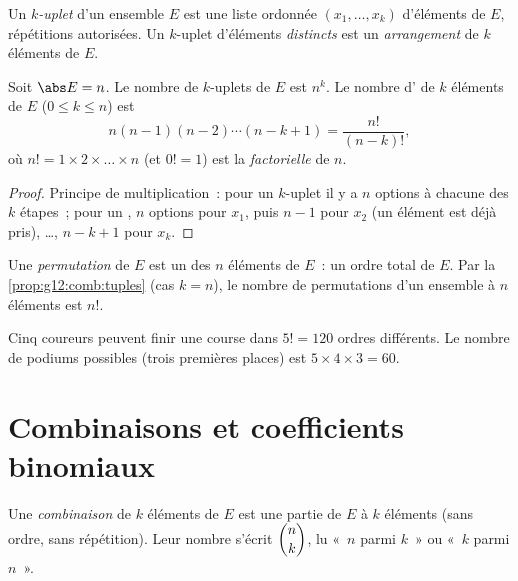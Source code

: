 \begin{definition}[$k$-uplets]\label{def:g12:comb:tuples}
Un \emph{$k$-uplet} d'un ensemble $E$ est une liste ordonnée
$(x_1, \dots, x_k)$ d'éléments de $E$, répétitions autorisées. Un
$k$-uplet d'éléments \emph{distincts} est un
\emph{arrangement} de $k$ éléments de $E$.
\end{definition}

\begin{proposition}\label{prop:g12:comb:tuples}
Soit $\abs E = n$. Le nombre de $k$-uplets de $E$ est $n^k$. Le nombre
d' de $k$ éléments de $E$ ($0 \leq k \leq n$) est
\[
n(n-1)(n-2)\cdots(n-k+1) = \frac{n!}{(n-k)!},
\]
où $n! = 1 \times 2 \times \dots \times n$ (et $0! = 1$) est la
\emph{factorielle} de $n$.
\end{proposition}

\begin{proof}
Principe de multiplication~: pour un $k$-uplet il y a $n$ options à chacune
des $k$ étapes~; pour un , $n$ options pour $x_1$, puis $n - 1$
pour $x_2$ (un élément est déjà pris), \ldots, $n - k + 1$ pour $x_k$.
\end{proof}

\begin{definition}[Permutation]\label{def:g12:comb:permutation}
Une \emph{permutation} de $E$ est un  des $n$
éléments de $E$~: un ordre total de $E$. Par la
\cref{prop:g12:comb:tuples} (cas $k = n$), le nombre de permutations d'un
ensemble à $n$ éléments est $n!$.
\end{definition}

\begin{example}
Cinq coureurs peuvent finir une course dans $5! = 120$ ordres différents.
Le nombre de podiums possibles (trois premières places) est
$5 \times 4 \times 3 = 60$.
\end{example}

\section{Combinaisons et coefficients binomiaux}

\begin{definition}[Combinaisons]\label{def:g12:comb:combination}
Une \emph{combinaison} de $k$ éléments de $E$ est une
partie de $E$ à $k$ éléments (sans ordre, sans répétition). Leur nombre
s'écrit $\dbinom{n}{k}$, lu «~$n$ parmi $k$~»
ou «~$k$ parmi $n$~».
\end{definition}

